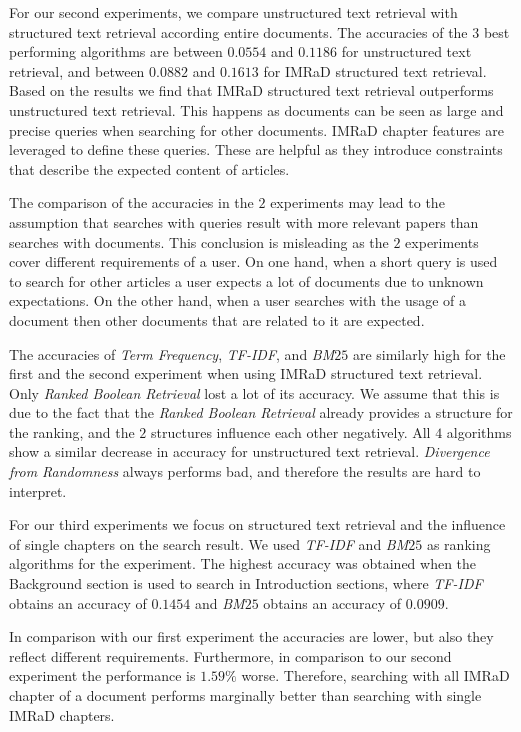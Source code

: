 For our second experiments, we compare unstructured text retrieval with structured text retrieval according entire documents. The accuracies of the $3$ best performing algorithms are between $0.0554$ and $0.1186$ for unstructured text retrieval, and between $0.0882$ and $0.1613$ for IMRaD structured text retrieval. Based on the results we find that IMRaD structured text retrieval outperforms unstructured text retrieval. This happens as documents can be seen as large and precise queries when searching for other documents. IMRaD chapter features are leveraged to define these queries. These are helpful as they introduce constraints that describe the expected content of articles.

The comparison of the accuracies in the $2$ experiments may lead to the assumption that searches with queries result with more relevant papers than searches with documents. This conclusion is misleading as the $2$ experiments cover different requirements of a user. On one hand, when a short query is used to search for other articles a user expects a lot of documents due to unknown expectations. On the other hand, when a user searches with the usage of a document then other documents that are related to it are expected.

The accuracies of \textit{Term Frequency}, \textit{TF-IDF}, and \textit{BM$25$} are similarly high for the first and the second experiment when using IMRaD structured text retrieval. Only \textit{Ranked Boolean Retrieval} lost a lot of its accuracy. We assume that this is due to the fact that the \textit{Ranked Boolean Retrieval} already provides a structure for the ranking, and the $2$ structures influence each other negatively. All $4$ algorithms show a similar decrease in accuracy for unstructured text retrieval. \textit{Divergence from Randomness} always performs bad, and therefore the results are hard to interpret.

For our third experiments we focus on structured text retrieval and the influence of single chapters on the search result. We used \textit{TF-IDF} and \textit{BM$25$} as ranking algorithms for the experiment. The highest accuracy was obtained when the Background section is used to search in Introduction sections, where \textit{TF-IDF} obtains an accuracy of $0.1454$ and \textit{BM$25$} obtains an accuracy of $0.0909$. 

In comparison with our first experiment the accuracies are lower, but also they reflect different requirements. Furthermore, in comparison to our second experiment the performance is $1.59\%$ worse. Therefore, searching with all IMRaD chapter of a document performs marginally better than searching with single IMRaD chapters.

